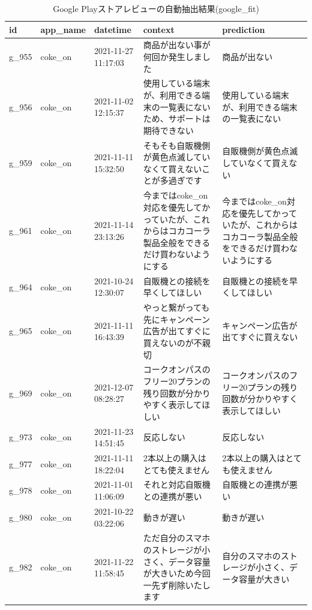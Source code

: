 \begin{table}[htbp]
  \caption{Google Playストアレビューの自動抽出結果(google\_fit)}
  \label{tb:googleqa}
  \small
  \begin{center}
  \begin{tabularx}{\linewidth}{|l|l|X|X|X|}
    \hline
    id&app\_name&datetime&context&prediction\\\hline\hline
    g\_955&coke\_on&2021-11-27 11:17:03&商品が出ない事が何回か発生しました&商品が出ない\\\hline
    g\_956&coke\_on&2021-11-02 12:15:37&使用している端末が、利用できる端末の一覧表にないため、サポートは期待できない&使用している端末が、利用できる端末の一覧表にない\\\hline
    g\_959&coke\_on&2021-11-11 15:32:50&そもそも自販機側が黄色点滅していなくて買えないことが多過ぎです&自販機側が黄色点滅していなくて買えない\\\hline
    g\_961&coke\_on&2021-11-14 23:13:26&今まではcoke\_on対応を優先してかっていたが、これからはコカコーラ製品全般をできるだけ買わないようにする&今まではcoke\_on対応を優先してかっていたが、これからはコカコーラ製品全般をできるだけ買わないようにする\\\hline
    g\_964&coke\_on&2021-10-24 12:30:07&自販機との接続を早くしてほしい&自販機との接続を早くしてほしい\\\hline
    g\_965&coke\_on&2021-11-11 16:43:39&やっと繋がっても先にキャンペーン広告が出てすぐに買えないのが不親切&キャンペーン広告が出てすぐに買えない\\\hline
    g\_969&coke\_on&2021-12-07 08:28:27&コークオンパスのフリー20プランの残り回数が分かりやすく表示してほしい&コークオンパスのフリー20プランの残り回数が分かりやすく表示してほしい\\\hline
    g\_973&coke\_on&2021-11-23 14:51:45&反応しない&反応しない\\\hline
    g\_977&coke\_on&2021-11-11 18:22:04&2本以上の購入はとても使えません&2本以上の購入はとても使えません\\\hline
    g\_978&coke\_on&2021-11-01 11:06:09&それと対応自販機との連携が悪い&自販機との連携が悪い\\\hline
    g\_980&coke\_on&2021-10-22 03:22:06&動きが遅い&動きが遅い\\\hline
    g\_982&coke\_on&2021-11-22 11:58:45&ただ自分のスマホのストレージが小さく、データ容量が大きいため今回一先ず削除いたします&自分のスマホのストレージが小さく、データ容量が大きい\\\hline
  \end{tabularx}\end{center}
\end{table}


